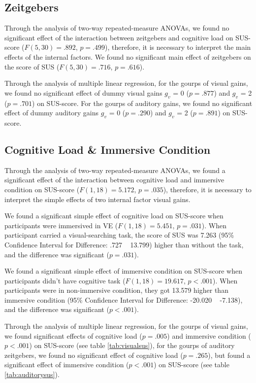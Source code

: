 \documentclass[sigconf]{acmart}
\begin{document}
\subsection*{Zeitgebers}

Through the analysis of two-way repeated-measure ANOVAs, we found no significant effect of the interaction between zeitgebers and cognitive load on SUS-score ($F(5,30) = .892$, $p = .499$), therefore, it is necessary to interpret the main effects of the internal factors. We found no significant main effect of zeitgebers on the score of SUS ($F(5,30) = .716$, $p = .616$).

Through the analysis of multiple linear regression, for the gourps of visual gains, we found no significant effect of dummy visual gains $g_v$ = 0 ($p = .877$) and $g_v$ = 2 ($p = .701$) on SUS-score. For the gourps of auditory gains, we found no significant effect of dummy auditory gains $g_v$ = 0 ($p = .290$) and $g_v$ = 2 ($p = .891$) on SUS-score.

\subsection*{Cognitive Load \& Immersive Condition}

Through the analysis of two-way repeated-measure ANOVAs, we found a significant effect of the interaction between cognitive load  and immersive condition on SUS-score ($F(1,18) = 5.172$, $p = .035$), therefore, it is necessary to interpret the simple effects of two internal factor visual gains. 

We found a significant simple effect of cognitive load on SUS-score when participants were immersived in VE ($F(1,18) = 5.451$, $p = .031$). When participant carried a visual-searching task, the score of SUS was 7.263 (95\% Confidence Interval for Difference: .727 ~ 13.799) higher than without the task, and the difference was significant ($p = .031$).

We found a significant simple effect of immersive condition on SUS-score when participants didn't have cognitive task ($F(1,18) = 19.617$, $p < .001$). When participants were in non-immersive condition, they got 13.579 higher than immersive condition (95\% Confidence Interval for Difference: -20.020 ~ -7.138), and the difference was significant ($p < .001$).

Through the analysis of multiple linear regression, for the gourps of visual gains, we found significant effects of cognitive load ($p = .005$) and immersive condition ($p < .001$) on SUS-score (see table \ref{tab:visualsus}), for the gourps of auditory zeitgebers, we found no  significant effect of cognitive load ($p = .265$), but found a significant effect of immersive condition ($p < .001$) on SUS-score (see table \ref{tab:auditorysus}).
\end{document}

